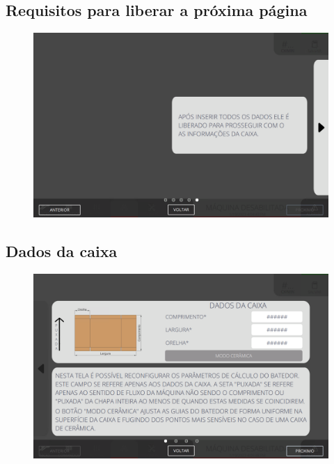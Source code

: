 \newpage
\thispagestyle{fancy}
\vspace*{40 pt}
\subsection{\small Requisitos para liberar a próxima página}
\vspace*{\fill}
\begin{figure}[h]
    \centering
    \includegraphics[width=576 px,height=360 px]{src/imagesICV/09-request/new/e-5.png}
\end{figure}
\vspace*{\fill}

\newpage
\thispagestyle{fancy}
\vspace*{40 pt}
\subsection{\small Dados da caixa}
\vspace*{\fill}
\begin{figure}[h]
    \centering
    \includegraphics[width=576 px,height=360 px]{src/imagesICV/09-request/new/e-6.png}
\end{figure}
\vspace*{\fill}

